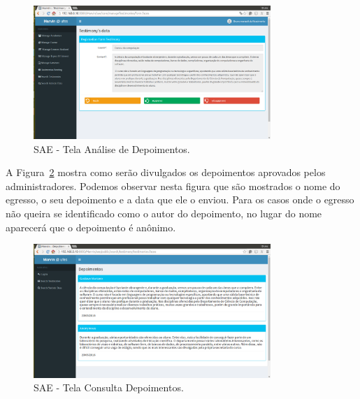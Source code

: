 \begin{figure}[h]
	\centering
	\includegraphics[width=0.8\textwidth]{figuras/projeto/fig-projeto-apresentacao-analise-depoimento}
	\caption{SAE - Tela Análise de Depoimentos.}
	\label{fig-projeto-apresentacao-analise-depoimento}
\end{figure}


\newpage
A Figura~\ref{fig-projeto-apresentacao-tela-depoimentos} mostra como serão divulgados os depoimentos aprovados pelos administradores. Podemos observar nesta figura que são mostrados o nome do egresso, o seu depoimento e a data que ele o enviou. Para os casos onde o egresso não queira se identificado como o autor do depoimento, no lugar do nome aparecerá que o depoimento é anônimo.


\begin{figure}[h]
	\centering
	\includegraphics[width=0.8\textwidth]{figuras/projeto/fig-projeto-apresentacao-tela-depoimentos}
	\caption{SAE - Tela Consulta Depoimentos.}
	\label{fig-projeto-apresentacao-tela-depoimentos}
\end{figure}














